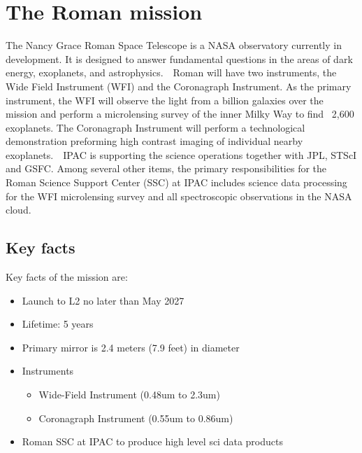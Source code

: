 \documentclass[11pt,twoside]{article}
\begin{document}


\section{The Roman mission}
The Nancy Grace Roman Space Telescope is a NASA observatory currently in development. It is designed to answer fundamental questions in the areas of dark energy, exoplanets, and astrophysics.  Roman will have two instruments, the Wide Field Instrument (WFI) and the Coronagraph Instrument. As the primary instrument, the WFI will observe the light from a billion galaxies over the mission and perform a microlensing survey of the inner Milky Way to find ~2,600 exoplanets. The Coronagraph Instrument will perform a technological demonstration preforming high contrast imaging of individual nearby exoplanets.  IPAC is supporting the science operations together with JPL, STScI and GSFC. Among several other items, the primary responsibilities for the Roman Science Support Center (SSC) at IPAC includes science data processing for the WFI microlensing survey and all spectroscopic observations in the NASA cloud.


\subsection{Key facts}

Key facts of the mission are:

\begin{itemize}
  \item Launch to L2 no later than May 2027
  \item Lifetime: 5 years
  \item Primary mirror is 2.4 meters (7.9 feet) in diameter
  \item Instruments
    \begin{itemize}
        \item Wide-Field Instrument (0.48um to 2.3um)
        \item Coronagraph Instrument (0.55um to 0.86um)
    \end{itemize}
  \item Roman SSC at IPAC to produce high level sci data products
\end{itemize}
\end{document}
